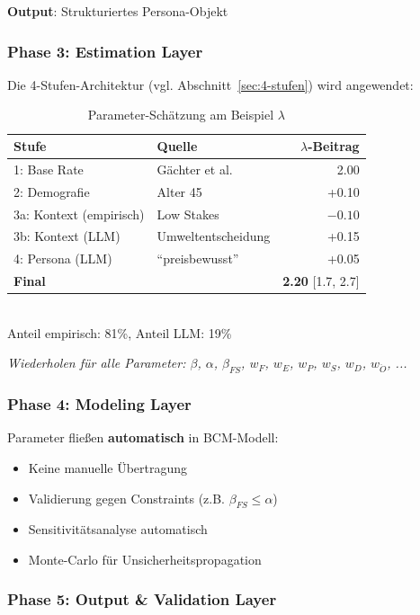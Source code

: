 \textbf{Output}: Strukturiertes Persona-Objekt

\subsubsection{Phase 3: Estimation Layer}

Die 4-Stufen-Architektur (vgl. Abschnitt~\ref{sec:4-stufen}) wird angewendet:

\begin{table}[h]
\centering
\caption{Parameter-Schätzung am Beispiel $\lambda$}
\begin{tabular}{@{}llr@{}}
\toprule
\textbf{Stufe} & \textbf{Quelle} & \textbf{$\lambda$-Beitrag} \\
\midrule
1: Base Rate & Gächter et al. & 2.00 \\
2: Demografie & Alter 45 & +0.10 \\
3a: Kontext (empirisch) & Low Stakes & $-0.10$ \\
3b: Kontext (LLM) & Umweltentscheidung & +0.15 \\
4: Persona (LLM) & ``preisbewusst'' & +0.05 \\
\midrule
\textbf{Final} & & \textbf{2.20} [1.7, 2.7] \\
\bottomrule
\end{tabular}
\\[0.3em]
\footnotesize Anteil empirisch: 81\%, Anteil LLM: 19\%
\end{table}

\textit{Wiederholen für alle Parameter: $\beta$, $\alpha$, $\beta_{FS}$, $w_F$, $w_E$, $w_P$, $w_S$, $w_D$, $w_{\ddot{O}}$, ...}

\subsubsection{Phase 4: Modeling Layer}

Parameter fließen \textbf{automatisch} in BCM-Modell:
\begin{itemize}
    \item Keine manuelle Übertragung
    \item Validierung gegen Constraints (z.B. $\beta_{FS} \leq \alpha$)
    \item Sensitivitätsanalyse automatisch
    \item Monte-Carlo für Unsicherheitspropagation
\end{itemize}

\subsubsection{Phase 5: Output \& Validation Layer}

